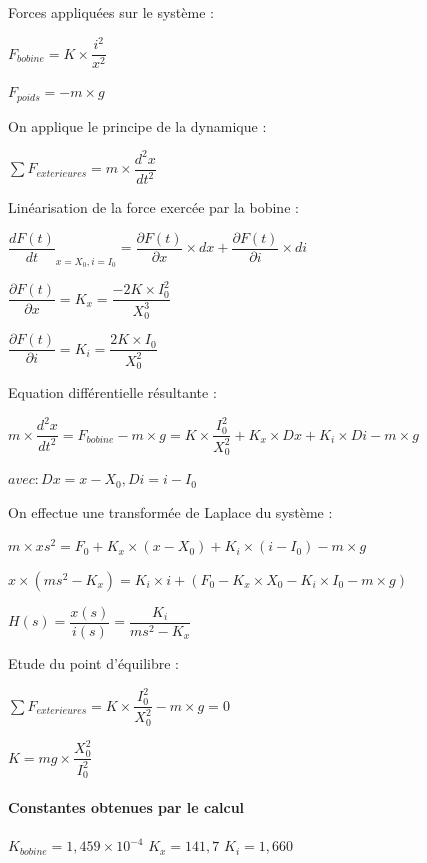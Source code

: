 \documentclass[11pt, french]{article} %
\begin{document}
Forces appliquées sur le système :
\newline

$ F_{bobine} = K \times \dfrac{i^2}{x^2}  $

$ F_{poids} = -m \times g $

On applique le principe de la dynamique :
\newline

$ \sum F_{exterieures}  = m \times {\dfrac{{d^2}x}{dt^2}} $

Linéarisation de la force exercée par la bobine :
\newline

$ {\dfrac{dF(t)}{dt}}_{x = X_0, i = I_0} = \dfrac{\partial F(t)}{\partial x} \times dx + \dfrac{\partial F(t)}{\partial i} \times di $

$ \dfrac{\partial F(t)}{\partial x} = K_x = \dfrac{-2K \times I_0^2}{X_0^3} $

$ \dfrac{\partial F(t)}{\partial i} = K_i = \dfrac{2K \times I_0}{X_0^2} $

Equation différentielle résultante :
\newline

$ m \times {\dfrac{{d^2}x}{dt^2}} = F_{bobine} - m \times g = K \times {\dfrac{I_0^2}{X_0^2}} + K_x \times Dx + K_i \times Di - m \times g $

$ avec : Dx = x - X_0, Di = i - I_0 $

On effectue une transformée de Laplace du système :
\newline

$ m \times x{s^2} = F_0 + K_x \times (x - X_0) + K_i \times (i - I_0) - m \times g $

$ x \times (m{s^2} - K_x) = K_i \times i +(F_0 - K_x \times X_0 - K_i \times I_0 - m \times g) $

$ H(s) = \dfrac{x(s)}{i(s)} = \dfrac{K_i}{m{s^2}- K_x}  $

Etude du point d'équilibre :
\newline

$ \sum F_{exterieures}  = K \times {\dfrac{I_0^2}{X_0^2}} - m \times g = 0 $

$ K = mg \times {\dfrac{X_0^2}{I_0^2}} $

\paragraph{Constantes obtenues par le calcul}

$ K_{bobine} = 1,459 \times 10^{-4} $
$ K_x = 141,7 $
$ K_i = 1,660 $
\end{document}
